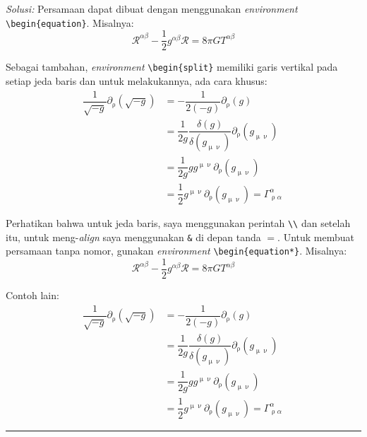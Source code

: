 \documentclass[a4paper, 11pt]{article}
\newenvironment{solution}
    {\textit{Solusi:}}
    {}
\begin{document}
\begin{solution}
Persamaan dapat dibuat dengan menggunakan \textit{environment} \verb|\begin{equation}|. Misalnya:
    \begin{equation}\label{eq: 1}
        \mathcal{R}^{\alpha\beta} - \dfrac{1}{2}g^{\alpha\beta}\mathcal{R} =
        8\pi GT^{\alpha\beta}
    \end{equation}

Sebagai tambahan, \textit{environment} \verb|\begin{split}| memiliki garis vertikal pada setiap jeda baris dan untuk melakukannya, ada cara khusus:
    \begin{equation}
    \begin{split}
        \dfrac{1}{\sqrt{-g}}\partial_{\uprho}(\sqrt{-g}) & = -\dfrac{1}{2(-g)}\partial_{\uprho}(g) \label{eq: 2} \\
        & = \dfrac{1}{2g}\dfrac{\delta(g)}{\delta(g_{\upmu\upnu})}\partial_{\uprho}(g_{\upmu\upnu}) \nonumber \\
        & = \dfrac{1}{2g}gg^{\upmu\upnu}\partial_{\uprho}(g_{\upmu\upnu}) \nonumber \\
        & = \dfrac{1}{2}g^{\upmu\upnu}\partial_{\uprho}(g_{\upmu\upnu}) = \Gamma^{\alpha}_{\uprho\alpha}\ \label{eq:3}
    \end{split}
    \end{equation}

Perhatikan bahwa untuk jeda baris, saya menggunakan perintah \verb|\\| dan setelah itu, untuk meng-\textit{align} saya menggunakan \verb|&| di depan tanda $=$. Untuk membuat persamaan tanpa nomor, gunakan \textit{environment} \verb|\begin{equation*}|. Misalnya:
    \begin{equation*}
        \mathcal{R}^{\alpha\beta} - \dfrac{1}{2}g^{\alpha\beta}\mathcal{R} =
        8\pi GT^{\alpha\beta}
    \end{equation*}

Contoh lain:
    \begin{equation*}
    \begin{split}
        \dfrac{1}{\sqrt{-g}}\partial_{\uprho}(\sqrt{-g}) & = -\dfrac{1}{2(-g)}\partial_{\uprho}(g) \label{eq: 2} \\
        & = \dfrac{1}{2g}\dfrac{\delta(g)}{\delta(g_{\upmu\upnu})}\partial_{\uprho}(g_{\upmu\upnu}) \nonumber \\
        & = \dfrac{1}{2g}gg^{\upmu\upnu}\partial_{\uprho}(g_{\upmu\upnu}) \nonumber \\
        & = \dfrac{1}{2}g^{\upmu\upnu}\partial_{\uprho}(g_{\upmu\upnu}) = \Gamma^{\alpha}_{\uprho\alpha}\ \label{eq:3}
    \end{split}
    \end{equation*}

\end{solution} 
\noindent\rule{7in}{2.8pt}
\end{document}
